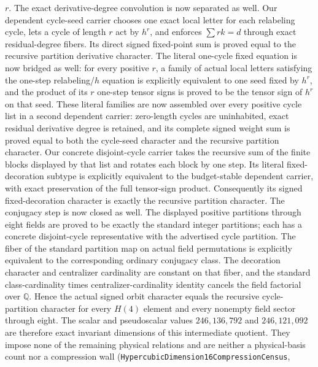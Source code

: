 \documentclass[11pt]{article}
\theoremstyle{definition}
\begin{document}
\begin{itemize}
    $r$.  The exact derivative-degree convolution is now separated as well.
    Our dependent cycle-seed carrier chooses one exact local letter for each
    relabeling cycle, lets a cycle of length $r$ act by $h^r$, and enforces
    $\sum r k=d$ through exact residual-degree fibers.  Its direct signed
    fixed-point sum is proved equal to the recursive partition derivative
    character.  The literal one-cycle fixed equation is now bridged as well:
    for every positive $r$, a family of actual local letters satisfying the
    one-step relabeling/$h$ equation is explicitly equivalent to one seed
    fixed by $h^r$, and the product of its $r$ one-step tensor signs is proved
    to be the tensor sign of $h^r$ on that seed.  These literal families are
    now assembled over every positive cycle list in a second dependent
    carrier: zero-length cycles are uninhabited, exact residual derivative
    degree is retained, and its complete signed weight sum is proved equal to
    both the cycle-seed character and the recursive partition character.  Our
    concrete disjoint-cycle carrier takes the recursive sum of the finite
    blocks displayed by that list and rotates each block by one step.  Its
    literal fixed-decoration subtype is explicitly equivalent to the
    budget-stable dependent carrier, with exact preservation of the full
    tensor-sign product.  Consequently its signed fixed-decoration character
    is exactly the recursive partition character.  The conjugacy step is now
    closed as well.  The displayed positive partitions through eight fields
    are proved to be exactly the standard integer partitions; each has a
    concrete disjoint-cycle representative with the advertised cycle
    partition.  The fiber of the standard partition map on actual field
    permutations is explicitly equivalent to the corresponding ordinary
    conjugacy class.  The decoration character and centralizer cardinality
    are constant on that fiber, and the standard class-cardinality times
    centralizer-cardinality identity cancels the field factorial over
    $\mathbb Q$.  Hence the actual signed orbit character equals the recursive
    cycle-partition character for every $H(4)$ element and every nonempty
    field sector through eight.  The scalar and pseudoscalar values
    $246{,}136{,}792$ and $246{,}121{,}092$ are therefore exact invariant
    dimensions of this intermediate quotient.  They impose none of the
    remaining physical relations and are neither a physical-basis count nor a
    compression wall
    (\texttt{HypercubicDimension16CompressionCensus},

\end{itemize}
\end{document}
